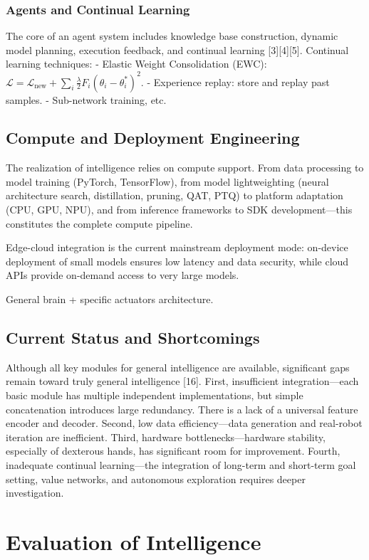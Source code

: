 \documentclass[12pt,a4paper]{article}
\begin{document}
\subsubsection{Agents and Continual Learning}
The core of an agent system includes knowledge base construction, dynamic model planning, execution feedback, and continual learning [3][4][5]. Continual learning techniques:
- Elastic Weight Consolidation (EWC): $\mathcal{L} = \mathcal{L}_{\text{new}} + \sum_i \frac{\lambda}{2} F_i (\theta_i - \theta_i^*)^2$.
- Experience replay: store and replay past samples.
- Sub-network training, etc.

\subsection{Compute and Deployment Engineering}
The realization of intelligence relies on compute support. From data processing to model training (PyTorch, TensorFlow), from model lightweighting (neural architecture search, distillation, pruning, QAT, PTQ) to platform adaptation (CPU, GPU, NPU), and from inference frameworks to SDK development—this constitutes the complete compute pipeline.

Edge-cloud integration is the current mainstream deployment mode: on-device deployment of small models ensures low latency and data security, while cloud APIs provide on-demand access to very large models.

General brain + specific actuators architecture.

\subsection{Current Status and Shortcomings}
Although all key modules for general intelligence are available, significant gaps remain toward truly general intelligence [16].
First, insufficient integration—each basic module has multiple independent implementations, but simple concatenation introduces large redundancy. There is a lack of a universal feature encoder and decoder.
Second, low data efficiency—data generation and real-robot iteration are inefficient.
Third, hardware bottlenecks—hardware stability, especially of dexterous hands, has significant room for improvement.
Fourth, inadequate continual learning—the integration of long-term and short-term goal setting, value networks, and autonomous exploration requires deeper investigation.

\section{Evaluation of Intelligence}
\end{document}
